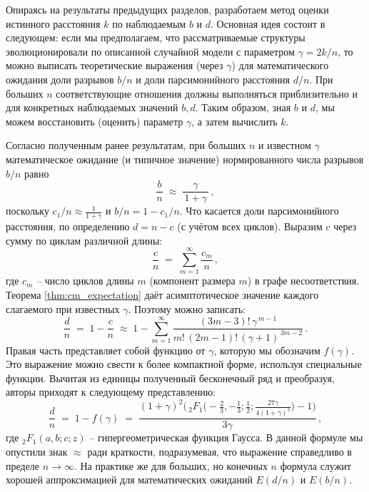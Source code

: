 Опираясь на результаты предыдущих разделов, разработаем метод оценки истинного расстояния $k$ по наблюдаемым $b$ и $d$. Основная идея состоит в следующем: если мы предполагаем, что рассматриваемые структуры эволюционировали по описанной случайной модели с параметром $\gamma = 2k/n$, то можно выписать теоретические выражения (через $\gamma$) для математического ожидания доли разрывов $b/n$ и доли парсимонийного расстояния $d/n$. При больших $n$ соответствующие отношения должны выполняться приблизительно и для конкретных наблюдаемых значений $b, d$. Таким образом, зная $b$ и $d$, мы можем восстановить (оценить) параметр $\gamma$, а затем вычислить $k$.

Согласно полученным ранее результатам, при больших $n$ и известном $\gamma$ математическое ожидание (и типичное значение) нормированного числа разрывов $b/n$ равно 
\[
\frac{b}{n} \;\approx\; \frac{\gamma}{\,1+\gamma\,}\,,
\] 
поскольку $c_1/n \approx \frac{1}{1+\gamma}$ и $b/n = 1 - c_1/n$. Что касается доли парсимонийного расстояния, по определению $d = n - c$ (с учётом всех циклов). Выразим $c$ через сумму по циклам различной длины: 
\[
\frac{c}{n} \;=\; \sum_{m=1}^{\infty} \frac{c_m}{n}\,,
\] 
где $c_m$ -- число циклов длины $m$ (компонент размера $m$) в графе несоответствия. Теорема \ref{thm:cm_expectation} даёт асимптотическое значение каждого слагаемого при известных $\gamma$. Поэтому можно записать:
\[
\frac{d}{n} \;=\; 1 - \frac{c}{n} \;\approx\; 1 - \sum_{m=1}^{\infty} \frac{(3m-3)!\, \gamma^{\,m-1}}{m!\, (2m-1)! \, (\gamma+1)^{\,3m-2}}\,. 
\] 
Правая часть представляет собой функцию от $\gamma$, которую мы обозначим $f(\gamma)$. Это выражение можно свести к более компактной форме, используя специальные функции. Вычитая из единицы полученный бесконечный ряд и преобразуя, авторы приходят к следующему представлению:
\begin{equation}\label{eq:d_hyper}
\frac{d}{n} \;=\; 1 - f(\gamma) \;=\; \frac{(1+\gamma)^2\Big(\,_2F_1\!\big(-\tfrac{2}{3}, -\tfrac{1}{3}; \tfrac{1}{2}; \frac{27\gamma}{4(1+\gamma)^3}\big) - 1\Big)}{3\gamma}\,,
\end{equation}
где $_2F_1(a,b;c;z)$ -- гипергеометрическая функция Гаусса. В данной формуле мы опустили знак $\approx$ ради краткости, подразумевая, что выражение справедливо в пределе $n \to \infty$.
На практике же для больших, но конечных $n$ формула служит хорошей аппроксимацией для математических ожиданий $E(d/n)$ и $E(b/n)$.


